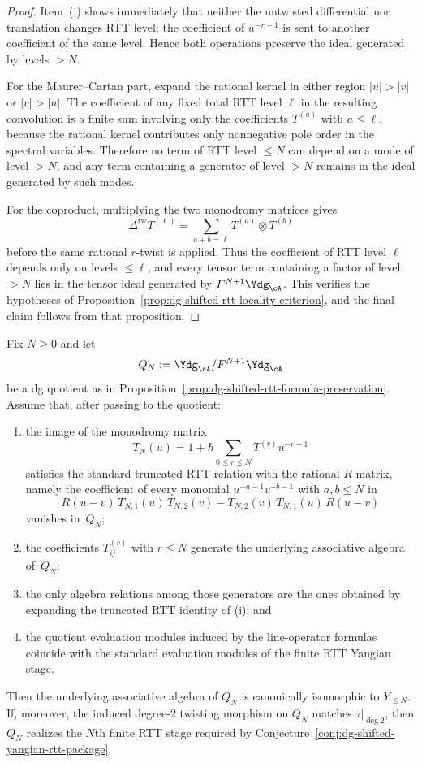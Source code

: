 \begin{proof}
Item~\textup{(i)} shows immediately that neither the untwisted
differential nor translation changes RTT level: the coefficient of
$u^{-r-1}$ is sent to another coefficient of the same level.  Hence
both operations preserve the ideal generated by levels $>N$.

For the Maurer--Cartan part, expand the rational kernel in either
region $|u|>|v|$ or $|v|>|u|$.  The coefficient of any fixed total RTT
level $\ell$ in the resulting convolution is a finite sum involving
only the coefficients $T^{(a)}$ with $a \le \ell$, because the rational
kernel contributes only nonnegative pole order in the spectral
variables.  Therefore no term of RTT level $\le N$ can depend on a mode
of level $>N$, and any term containing a generator of level $>N$
remains in the ideal generated by such modes.

For the coproduct, multiplying the two monodromy matrices gives
\[
\Delta^{\mathrm{tw}}T^{(\ell)}
=\sum_{a+b=\ell} T^{(a)}\otimes T^{(b)}
\]
before the same rational $r$-twist is applied.  Thus the coefficient of
RTT level $\ell$ depends only on levels $\le \ell$, and every tensor
term containing a factor of level $>N$ lies in the tensor ideal
generated by $F^{N+1}\Ydg_{\cA}$.  This verifies the hypotheses of
Proposition~\ref{prop:dg-shifted-rtt-locality-criterion}, and the final
claim follows from that proposition.
\end{proof}

\begin{proposition}
\label{prop:dg-shifted-rtt-coefficient-criterion}
Fix $N \ge 0$ and let
\[
Q_N:=\Ydg_{\cA}/F^{N+1}\Ydg_{\cA}
\]
be a dg quotient as in
Proposition~\ref{prop:dg-shifted-rtt-formula-preservation}.  Assume
that, after passing to the quotient:
\begin{enumerate}[label=\textup{(\roman*)}]
\item the image of the monodromy matrix
  \[
  T_N(u)=1+\hbar\sum_{0 \le r \le N} T^{(r)}u^{-r-1}
  \]
  satisfies the standard truncated RTT relation with the rational
  $R$-matrix, namely the coefficient of every monomial
  $u^{-a-1}v^{-b-1}$ with $a,b \le N$ in
  \[
  R(u-v)\,T_{N,1}(u)\,T_{N,2}(v)-T_{N,2}(v)\,T_{N,1}(u)\,R(u-v)
  \]
  vanishes in~$Q_N$;
\item the coefficients $T^{(r)}_{ij}$ with $r \le N$ generate the
  underlying associative algebra of~$Q_N$;
\item the only algebra relations among those generators are the ones
  obtained by expanding the truncated RTT identity of
  \textup{(i)}; and
\item the quotient evaluation modules induced by the line-operator
  formulas coincide with the standard evaluation modules of the finite
  RTT Yangian stage.
\end{enumerate}
Then the underlying associative algebra of $Q_N$ is canonically
isomorphic to $Y_{\le N}$.  If, moreover, the induced degree-$2$
twisting morphism on $Q_N$ matches $\tau|_{\deg 2}$, then $Q_N$
realizes the $N$th finite RTT stage required by
Conjecture~\ref{conj:dg-shifted-yangian-rtt-package}.
\end{proposition}

